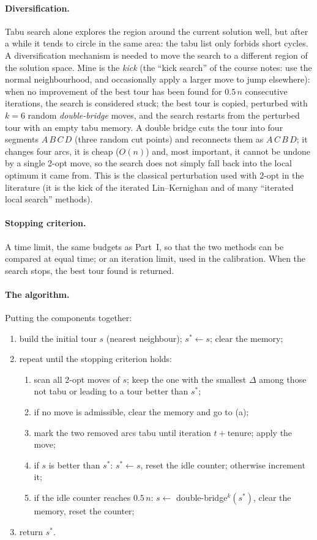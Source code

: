 \documentclass[11pt,a4paper]{article}
\begin{document}
\paragraph{Diversification.}
Tabu search alone explores the region around the current solution well, but after a while it
tends to circle in the same area: the tabu list only forbids short cycles. A diversification
mechanism is needed to move the search to a different region of the solution space. Mine is
the \emph{kick} (the ``kick search'' of the course notes: use the normal neighbourhood, and
occasionally apply a larger move to jump elsewhere): when no improvement of the best tour has been found for $0.5\,n$ consecutive
iterations, the search is considered stuck; the best tour is copied, perturbed with $k=6$
random \emph{double-bridge} moves, and the search restarts from the perturbed tour with an
empty tabu memory. A double bridge cuts the tour into four segments $A\,B\,C\,D$ (three random
cut points) and reconnects them as $A\,C\,B\,D$; it changes four arcs, it is cheap ($O(n)$)
and, most important, it cannot be undone by a single 2-opt move, so the search does not simply
fall back into the local optimum it came from. This is the classical perturbation used with
2-opt in the literature (it is the kick of the iterated Lin--Kernighan and of many ``iterated
local search'' methods).

\paragraph{Stopping criterion.}
A time limit, the same budgets as Part~I, so that the two methods can be compared at equal
time; or an iteration limit, used in the calibration. When the search stops, the best tour
found is returned.

\paragraph{The algorithm.}
Putting the components together:
\begin{enumerate}[nosep]
  \item build the initial tour $s$ (nearest neighbour); $s^*\leftarrow s$; clear the memory;
  \item repeat until the stopping criterion holds:
  \begin{enumerate}[nosep]
    \item scan all 2-opt moves of $s$; keep the one with the smallest $\Delta$ among those not
      tabu or leading to a tour better than $s^*$;
    \item if no move is admissible, clear the memory and go to (a);
    \item mark the two removed arcs tabu until iteration $t+\text{tenure}$; apply the move;
    \item if $s$ is better than $s^*$: $s^*\leftarrow s$, reset the idle counter; otherwise
      increment it;
    \item if the idle counter reaches $0.5\,n$: $s\leftarrow$ double-bridge$^k(s^*)$, clear
      the memory, reset the counter;
  \end{enumerate}
  \item return $s^*$.
\end{enumerate}
\end{document}
